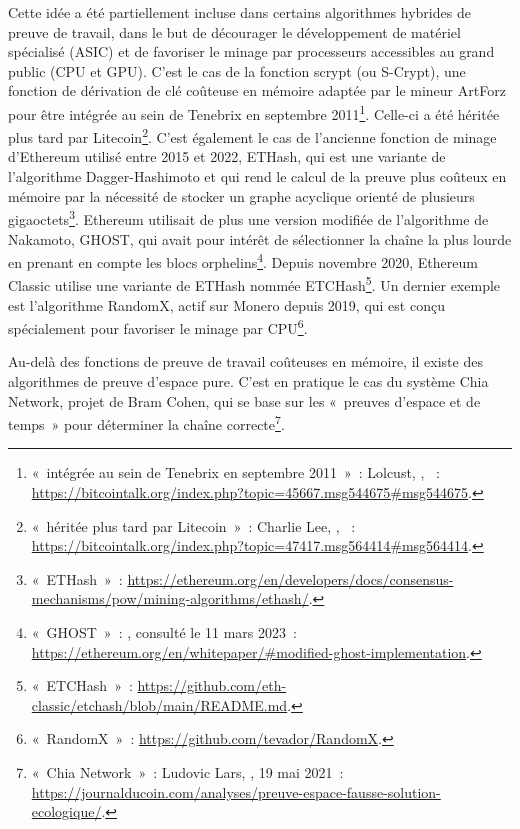 Cette idée a été partiellement incluse dans certains algorithmes hybrides de preuve de travail, dans le but de décourager le développement de matériel spécialisé (ASIC) et de favoriser le minage par processeurs accessibles au grand public (CPU et GPU). C'est le cas de la fonction scrypt (ou S-Crypt), une fonction de dérivation de clé coûteuse en mémoire adaptée par le mineur ArtForz pour être intégrée au sein de Tenebrix en septembre 2011\footnote{«~intégrée au sein de Tenebrix en septembre 2011~»~: Lolcust, , ~: \url{https://bitcointalk.org/index.php?topic=45667.msg544675\#msg544675}.}. Celle-ci a été héritée plus tard par Litecoin\footnote{«~héritée plus tard par Litecoin~»~: Charlie Lee, , ~: \url{https://bitcointalk.org/index.php?topic=47417.msg564414\#msg564414}.}. C'est également le cas de l'ancienne fonction de minage d'Ethereum utilisé entre 2015 et 2022, ETHash, qui est une variante de l'algorithme Dagger-Hashimoto et qui rend le calcul de la preuve plus coûteux en mémoire par la nécessité de stocker un graphe acyclique orienté de plusieurs gigaoctets\footnote{«~ETHash~»~: \url{https://ethereum.org/en/developers/docs/consensus-mechanisms/pow/mining-algorithms/ethash/}.}. Ethereum utilisait de plus une version modifiée de l'algorithme de Nakamoto, GHOST, qui avait pour intérêt de sélectionner la chaîne la plus lourde en prenant en compte les blocs orphelins\footnote{«~GHOST~»~: , consulté le 11 mars 2023~: \url{https://ethereum.org/en/whitepaper/\#modified-ghost-implementation}.}. Depuis novembre 2020, Ethereum Classic utilise une variante de ETHash nommée ETCHash\footnote{«~ETCHash~»~: \url{https://github.com/eth-classic/etchash/blob/main/README.md}.}. Un dernier exemple est l'algorithme RandomX, actif sur Monero depuis 2019, qui est conçu spécialement pour favoriser le minage par CPU\footnote{«~RandomX~»~: \url{https://github.com/tevador/RandomX}.}.

Au-delà des fonctions de preuve de travail coûteuses en mémoire, il existe des algorithmes de preuve d'espace pure. C'est en pratique le cas du système Chia Network, projet de Bram Cohen, qui se base sur les «~preuves d'espace et de temps~» pour déterminer la chaîne correcte\footnote{«~Chia Network~»~: Ludovic Lars, , 19 mai 2021~: \url{https://journalducoin.com/analyses/preuve-espace-fausse-solution-ecologique/}.}.

